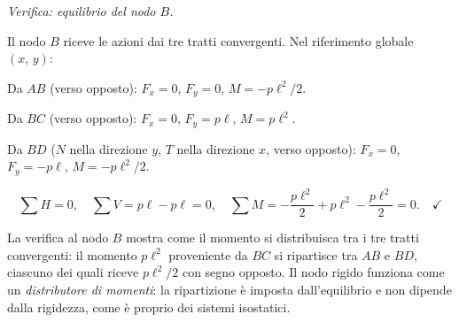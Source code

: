\medskip
\noindent\textit{Verifica: equilibrio del nodo $B$.}

\noindent Il nodo $B$ riceve le azioni dai tre tratti
convergenti. Nel riferimento globale $(x,\,y)$:

\noindent Da $AB$ (verso opposto):
$F_x = 0$, $F_y = 0$, $M = -p\ell^2/2$.

\noindent Da $BC$ (verso opposto):
$F_x = 0$, $F_y = p\ell$, $M = p\ell^2$.

\noindent Da $BD$ ($N$ nella direzione $y$,
$T$ nella direzione $x$, verso opposto):
$F_x = 0$, $F_y = -p\ell$, $M = -p\ell^2/2$.

\[
\sum H = 0, \quad
\sum V = p\ell - p\ell = 0, \quad
\sum M = -\frac{p\ell^2}{2} + p\ell^2
- \frac{p\ell^2}{2} = 0.
\quad\checkmark
\]

\begin{oss}
	La verifica al nodo $B$ mostra come il
	momento si distribuisca tra i tre tratti
	convergenti: il momento $p\ell^2$ proveniente
	da $BC$ si ripartisce tra $AB$ e $BD$,
	ciascuno dei quali riceve $p\ell^2/2$
	con segno opposto. Il nodo rigido funziona
	come un \emph{distributore di momenti}:
	la ripartizione è imposta dall'equilibrio
	e non dipende dalla rigidezza, come è
	proprio dei sistemi isostatici.
\end{oss}

